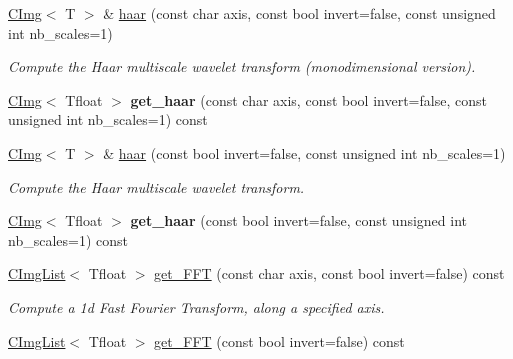\begin{DoxyCompactItemize}
\item 
\hyperlink{structcimg__library_1_1CImg}{CImg}$<$ T $>$ \& \hyperlink{structcimg__library_1_1CImg_a09afff280828c5a8d5a7bef22993dacc}{haar} (const char axis, const bool invert=false, const unsigned int nb\_\-scales=1)
\begin{DoxyCompactList}\small\item\em Compute the Haar multiscale wavelet transform (monodimensional version). \item\end{DoxyCompactList}\item 
\hypertarget{structcimg__library_1_1CImg_aadcc510c6d5bd17092150e6024d52383}{
\hyperlink{structcimg__library_1_1CImg}{CImg}$<$ Tfloat $>$ {\bfseries get\_\-haar} (const char axis, const bool invert=false, const unsigned int nb\_\-scales=1) const }
\label{structcimg__library_1_1CImg_aadcc510c6d5bd17092150e6024d52383}

\item 
\hyperlink{structcimg__library_1_1CImg}{CImg}$<$ T $>$ \& \hyperlink{structcimg__library_1_1CImg_adbb11ae1fffb253f45f3d0ff85a6857b}{haar} (const bool invert=false, const unsigned int nb\_\-scales=1)
\begin{DoxyCompactList}\small\item\em Compute the Haar multiscale wavelet transform. \item\end{DoxyCompactList}\item 
\hypertarget{structcimg__library_1_1CImg_ae2fb58636d47e185c1ab1f18ec4cef03}{
\hyperlink{structcimg__library_1_1CImg}{CImg}$<$ Tfloat $>$ {\bfseries get\_\-haar} (const bool invert=false, const unsigned int nb\_\-scales=1) const }
\label{structcimg__library_1_1CImg_ae2fb58636d47e185c1ab1f18ec4cef03}

\item 
\hypertarget{structcimg__library_1_1CImg_ae9e7074da9c9955e37e9eebbd5bd9c22}{
\hyperlink{structcimg__library_1_1CImgList}{CImgList}$<$ Tfloat $>$ \hyperlink{structcimg__library_1_1CImg_ae9e7074da9c9955e37e9eebbd5bd9c22}{get\_\-FFT} (const char axis, const bool invert=false) const }
\label{structcimg__library_1_1CImg_ae9e7074da9c9955e37e9eebbd5bd9c22}

\begin{DoxyCompactList}\small\item\em Compute a 1d Fast Fourier Transform, along a specified axis. \item\end{DoxyCompactList}\item 
\hypertarget{structcimg__library_1_1CImg_a344967c8b6e7bf0aa40039d1ab29efe2}{
\hyperlink{structcimg__library_1_1CImgList}{CImgList}$<$ Tfloat $>$ \hyperlink{structcimg__library_1_1CImg_a344967c8b6e7bf0aa40039d1ab29efe2}{get\_\-FFT} (const bool invert=false) const }
\label{structcimg__library_1_1CImg_a344967c8b6e7bf0aa40039d1ab29efe2}


\end{DoxyCompactItemize}
